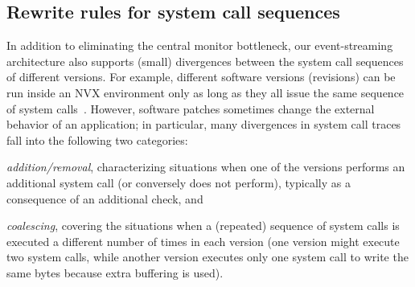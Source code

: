 

\subsection{Rewrite rules for system call sequences}
\label{sec:rw}

In addition to eliminating the central monitor bottleneck, our event-streaming
architecture also supports (small) divergences between the system call
sequences of different versions.  For example, different software versions
(revisions) can be run inside an NVX environment only as long as they all issue
the same sequence of system calls~\cite{mx}.  However, software patches
sometimes change the external behavior of an application; in particular, many
divergences in system call traces fall into the following two categories:
\begin{inparaenum}[(i)]
\item \emph{addition/removal}, characterizing situations when one
  of the versions performs an additional system call (or conversely
  does not perform), typically as a consequence of an additional
  check, and
\item \emph{coalescing}, covering the situations when a (repeated)
  sequence of system calls is executed a different number of times
  in each version (\eg one version might execute two  system calls,
  while another version executes only one  system call to write the
  same bytes because extra buffering is used).  
\end{inparaenum}


